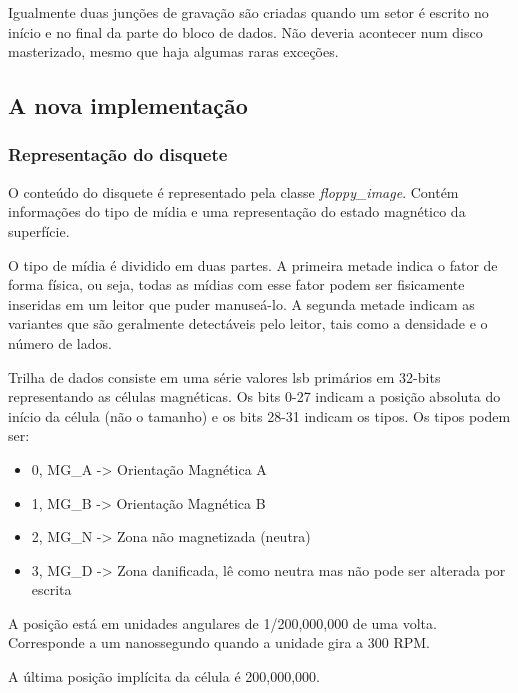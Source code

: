 \documentclass[letterpaper,10pt,brazil]{sphinxmanual}
\begin{document}
Igualmente duas junções de gravação são criadas quando um setor é
escrito no início e no final da parte do bloco de dados. Não deveria
acontecer num disco masterizado, mesmo que haja algumas raras exceções.


\subsection{A nova implementação}
\label{techspecs/floppy:a-nova-implementacao}

\subsubsection{Representação do disquete}
\label{techspecs/floppy:representacao-do-disquete}
O conteúdo do disquete é representado pela classe \emph{floppy\_image}.
Contém informações do tipo de mídia e uma representação do estado
magnético da superfície.

O tipo de mídia é dividido em duas partes. A primeira metade indica o
fator de forma física, ou seja, todas as mídias com esse fator podem ser
fisicamente inseridas em um leitor que puder manuseá-lo.
A segunda metade indicam as variantes que são geralmente detectáveis
pelo leitor, tais como a densidade e o número de lados.

Trilha de dados consiste em uma série valores lsb primários em 32-bits
representando as células magnéticas. Os bits 0-27 indicam a posição
absoluta do início da célula (não o tamanho) e os bits 28-31 indicam os
tipos. Os tipos podem ser:
\begin{itemize}
\item {} 
0, MG\_A -\textgreater{} Orientação Magnética A

\item {} 
1, MG\_B -\textgreater{} Orientação Magnética B

\item {} 
2, MG\_N -\textgreater{} Zona não magnetizada (neutra)

\item {} 
3, MG\_D -\textgreater{} Zona danificada, lê como neutra mas não pode ser alterada
por escrita

\end{itemize}

A posição está em unidades angulares de 1/200,000,000 de uma volta.
Corresponde a um nanossegundo quando a unidade gira a 300 RPM.

A última posição implícita da célula é 200,000,000.
\end{document}
